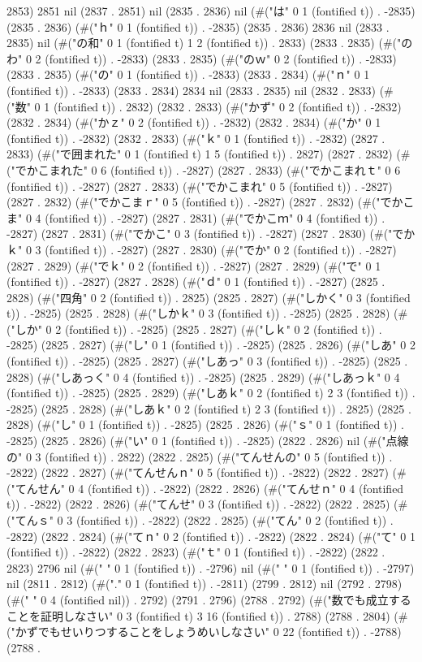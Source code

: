 2853) 2851 nil (2837 . 2851) nil (2835 . 2836) nil (#("は" 0 1 (fontified t)) . -2835) (2835 . 2836) (#("ｈ" 0 1 (fontified t)) . -2835) (2835 . 2836) 2836 nil (2833 . 2835) nil (#("の和" 0 1 (fontified t) 1 2 (fontified t)) . 2833) (2833 . 2835) (#("のわ" 0 2 (fontified t)) . -2833) (2833 . 2835) (#("のｗ" 0 2 (fontified t)) . -2833) (2833 . 2835) (#("の" 0 1 (fontified t)) . -2833) (2833 . 2834) (#("ｎ" 0 1 (fontified t)) . -2833) (2833 . 2834) 2834 nil (2833 . 2835) nil (2832 . 2833) (#("数" 0 1 (fontified t)) . 2832) (2832 . 2833) (#("かず" 0 2 (fontified t)) . -2832) (2832 . 2834) (#("かｚ" 0 2 (fontified t)) . -2832) (2832 . 2834) (#("か" 0 1 (fontified t)) . -2832) (2832 . 2833) (#("ｋ" 0 1 (fontified t)) . -2832) (2827 . 2833) (#("で囲まれた" 0 1 (fontified t) 1 5 (fontified t)) . 2827) (2827 . 2832) (#("でかこまれた" 0 6 (fontified t)) . -2827) (2827 . 2833) (#("でかこまれｔ" 0 6 (fontified t)) . -2827) (2827 . 2833) (#("でかこまれ" 0 5 (fontified t)) . -2827) (2827 . 2832) (#("でかこまｒ" 0 5 (fontified t)) . -2827) (2827 . 2832) (#("でかこま" 0 4 (fontified t)) . -2827) (2827 . 2831) (#("でかこｍ" 0 4 (fontified t)) . -2827) (2827 . 2831) (#("でかこ" 0 3 (fontified t)) . -2827) (2827 . 2830) (#("でかｋ" 0 3 (fontified t)) . -2827) (2827 . 2830) (#("でか" 0 2 (fontified t)) . -2827) (2827 . 2829) (#("でｋ" 0 2 (fontified t)) . -2827) (2827 . 2829) (#("で" 0 1 (fontified t)) . -2827) (2827 . 2828) (#("ｄ" 0 1 (fontified t)) . -2827) (2825 . 2828) (#("四角" 0 2 (fontified t)) . 2825) (2825 . 2827) (#("しかく" 0 3 (fontified t)) . -2825) (2825 . 2828) (#("しかｋ" 0 3 (fontified t)) . -2825) (2825 . 2828) (#("しか" 0 2 (fontified t)) . -2825) (2825 . 2827) (#("しｋ" 0 2 (fontified t)) . -2825) (2825 . 2827) (#("し" 0 1 (fontified t)) . -2825) (2825 . 2826) (#("しあ" 0 2 (fontified t)) . -2825) (2825 . 2827) (#("しあっ" 0 3 (fontified t)) . -2825) (2825 . 2828) (#("しあっく" 0 4 (fontified t)) . -2825) (2825 . 2829) (#("しあっｋ" 0 4 (fontified t)) . -2825) (2825 . 2829) (#("しあｋ" 0 2 (fontified t) 2 3 (fontified t)) . -2825) (2825 . 2828) (#("しあｋ" 0 2 (fontified t) 2 3 (fontified t)) . 2825) (2825 . 2828) (#("し" 0 1 (fontified t)) . -2825) (2825 . 2826) (#("ｓ" 0 1 (fontified t)) . -2825) (2825 . 2826) (#("い" 0 1 (fontified t)) . -2825) (2822 . 2826) nil (#("点線の" 0 3 (fontified t)) . 2822) (2822 . 2825) (#("てんせんの" 0 5 (fontified t)) . -2822) (2822 . 2827) (#("てんせんｎ" 0 5 (fontified t)) . -2822) (2822 . 2827) (#("てんせん" 0 4 (fontified t)) . -2822) (2822 . 2826) (#("てんせｎ" 0 4 (fontified t)) . -2822) (2822 . 2826) (#("てんせ" 0 3 (fontified t)) . -2822) (2822 . 2825) (#("てんｓ" 0 3 (fontified t)) . -2822) (2822 . 2825) (#("てん" 0 2 (fontified t)) . -2822) (2822 . 2824) (#("てｎ" 0 2 (fontified t)) . -2822) (2822 . 2824) (#("て" 0 1 (fontified t)) . -2822) (2822 . 2823) (#("ｔ" 0 1 (fontified t)) . -2822) (2822 . 2823) 2796 nil (#(" " 0 1 (fontified t)) . -2796) nil (#(" " 0 1 (fontified t)) . -2797) nil (2811 . 2812) (#("." 0 1 (fontified t)) . -2811) (2799 . 2812) nil (2792 . 2798) (#("	   " 0 4 (fontified nil)) . 2792) (2791 . 2796) (2788 . 2792) (#("数でも成立することを証明しなさい" 0 3 (fontified t) 3 16 (fontified t)) . 2788) (2788 . 2804) (#("かずでもせいりつすることをしょうめいしなさい" 0 22 (fontified t)) . -2788) (2788 . 